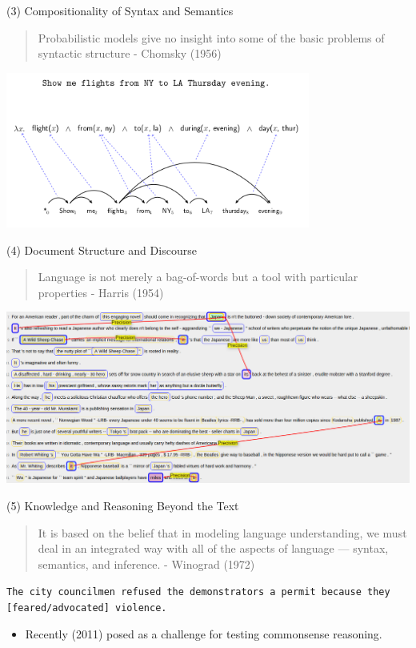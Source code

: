 \documentclass{beamer}
\begin{document}
\begin{frame}{(3) Compositionality of Syntax and Semantics}
  \begin{quote}
    Probabilistic models give no insight into some of the basic
    problems of syntactic structure  {\normalfont - Chomsky (1956)}
  \end{quote}
  \begin{center}
    \includegraphics[width=10cm]{syntaxsem}
  \end{center}
\end{frame}


\begin{frame}{(4) Document Structure and Discourse}
  \begin{quote}
    Language is not merely a bag-of-words but a tool with particular
    properties  { - \normalfont Harris (1954)}
  \end{quote}
  \begin{center}
    \includegraphics[width=\textwidth]{cort}
  \end{center}
\end{frame}

\begin{frame}{(5) Knowledge and Reasoning Beyond the Text}
\begin{quote}
It is based on the belief that in modeling language understanding, we must deal in an integrated way with all of the aspects of language — syntax, semantics, and inference. {- \normalfont Winograd (1972) }  
\end{quote}


\texttt{The city councilmen refused the demonstrators a permit because they [feared/advocated] violence.}


\begin{itemize}
\item Recently (2011) posed as a challenge for testing commonsense reasoning.  

\end{itemize}
\end{frame}
\end{document}
